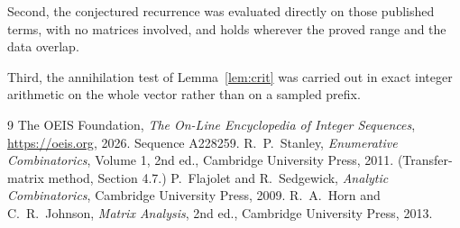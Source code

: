 \documentclass[11pt,a4paper]{article}
\theoremstyle{plain}
\theoremstyle{definition}
\begin{document}
Second, the conjectured recurrence was evaluated directly on those published terms, with no
matrices involved, and holds wherever the proved range and the data overlap.

Third, the annihilation test of Lemma~\ref{lem:crit} was carried out in exact integer
arithmetic on the whole vector rather than on a sampled prefix.

\begin{thebibliography}{9}
 The OEIS Foundation, \emph{The On-Line Encyclopedia of Integer
Sequences}, \url{https://oeis.org}, 2026. Sequence A228259.
 R.~P.~Stanley, \emph{Enumerative Combinatorics}, Volume 1, 2nd ed.,
Cambridge University Press, 2011. (Transfer-matrix method, Section 4.7.)
 P.~Flajolet and R.~Sedgewick, \emph{Analytic Combinatorics}, Cambridge
University Press, 2009.
 R.~A.~Horn and C.~R.~Johnson, \emph{Matrix Analysis}, 2nd ed., Cambridge
University Press, 2013.
\end{thebibliography}
\end{document}
